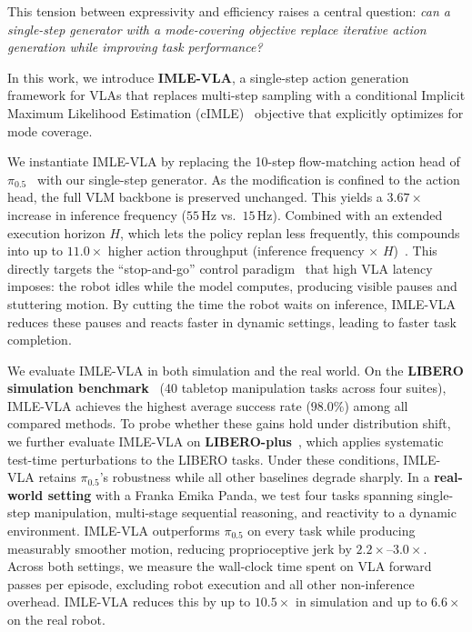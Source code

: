 \documentclass[letterpaper, 10 pt, conference]{ieeeconf}  %
\begin{document}
This tension between expressivity and efficiency raises a central question: \textit{can a single-step generator with a mode-covering objective replace iterative action generation while improving task performance?}

In this work, we introduce \textbf{IMLE-VLA}, a single-step action generation framework for VLAs that replaces multi-step sampling with a conditional Implicit Maximum Likelihood Estimation (cIMLE)~\cite{imle,aghabozorgi2023adaptive,peng2022chimle,vashist2024rsimle,aghabozorgi2026wimle} objective that explicitly optimizes for mode coverage.

We instantiate IMLE-VLA by replacing the 10-step flow-matching action head of $\pi_{0.5}$~\cite{black2025pi05} with our single-step generator. As the modification is confined to the action head, the full VLM backbone is preserved unchanged. This yields a $3.67\times$ increase in inference frequency ($55$\,Hz vs.\ $15$\,Hz). Combined with an extended execution horizon $H$, which lets the policy replan less frequently, this compounds into up to $11.0\times$ higher action throughput (inference frequency $\times$ $H$)~\cite{kim2025openvlaoft,pertsch2025fast,jeon2025shallow,ma2025realtime,hirose2025asyncvla}. This directly targets the ``stop-and-go'' control paradigm~\cite{brohan2023rt2,kim2024openvla,zhao2023act,black2024pi0,black2025pi05,ghosh2024octo,pertsch2025fast} that high VLA latency imposes: the robot idles while the model computes, producing visible pauses and stuttering motion. By cutting the time the robot waits on inference, IMLE-VLA reduces these pauses and reacts faster in dynamic settings, leading to faster task completion.

We evaluate IMLE-VLA in both simulation and the real world. On the \textbf{LIBERO simulation benchmark}~\cite{liu2023libero} (40 tabletop manipulation tasks across four suites), IMLE-VLA achieves the highest average success rate ($98.0\%$) among all compared methods. To probe whether these gains hold under distribution shift, we further evaluate IMLE-VLA on \textbf{LIBERO-plus}~\cite{fei25libero-plus}, which applies systematic test-time perturbations to the LIBERO tasks. Under these conditions, IMLE-VLA retains $\pi_{0.5}$'s robustness while all other baselines degrade sharply. In a \textbf{real-world setting} with a Franka Emika Panda, we test four tasks spanning single-step manipulation, multi-stage sequential reasoning, and reactivity to a dynamic environment. IMLE-VLA outperforms $\pi_{0.5}$ on every task while producing measurably smoother motion, reducing proprioceptive jerk by $2.2\times$--$3.0\times$. Across both settings, we measure the wall-clock time spent on VLA forward passes per episode, excluding robot execution and all other non-inference overhead. IMLE-VLA reduces this by up to $10.5\times$ in simulation and up to $6.6\times$ on the real robot. 
\end{document}
